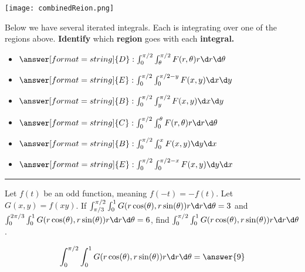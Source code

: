 \documentclass{ximera}
\begin{document}
\begin{problem}
\begin{onlineOnly}
\begin{image}
      \texttt{[image: combinedReion.png]}
    \end{image}
  \end{onlineOnly}
  Below we have several iterated integrals. Each is integrating over one
  of the regions above. \textbf{Identify} which \textbf{region} goes with each \textbf{integral.}
  \begin{itemize}
    \item[] $\answer[format=string]{D}: \int_0^{\pi/2} \int_{\theta}^{\pi/2}F(r,\theta)r \d r\d\theta$
    \item[] $\answer[format=string]{E}: \int_0^{\pi/2} \int_{0}^{\pi/2-y}F(x,y) \d x\d y$
    \item[] $\answer[format=string]{B}: \int_0^{\pi/2} \int_{y}^{\pi/2}F(x,y) \d x\d y$
    \item[] $\answer[format=string]{C}: \int_0^{\pi/2} \int_0^{\theta}F(r,\theta)r \d r\d \theta$
    \item[] $\answer[format=string]{B}: \int_0^{\pi/2} \int_{0}^{x}F(x,y) \d y\d x$
    \item[] $\answer[format=string]{E}: \int_0^{\pi/2} \int_{0}^{\pi/2-x}F(x,y) \d y\d x$
    \pdfOnly{\end{multicols}}
  \end{itemize}
\end{problem}

\hrule

\begin{problem}
  Let $f(t)$ be an odd function, meaning $f(-t) = -f(t)$. Let $G(x,y)
  = f(xy)$. If $\int_{\pi/3}^{\pi/2} \int_0^1 G(r \cos(\theta),r\sin(\theta))r\d r\d\theta = 3$ and $\int_{0}^{2\pi/3} \int_0^1 G(r \cos(\theta),r\sin(\theta))r\d r\d\theta = 6$, find  $\int_{0}^{\pi/2} \int_0^1 G(r \cos(\theta),r\sin(\theta))r\d r\d\theta$.
  \begin{prompt}
  \[
  \int_{0}^{\pi/2} \int_0^1 G(r \cos(\theta),r\sin(\theta))r\d r\d\theta = \answer{9}
  \]
  \end{prompt}
\end{problem}

\vfill
\end{document}
